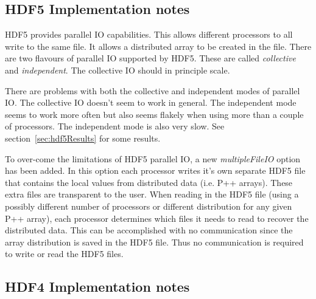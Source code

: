 \documentclass{article}
\begin{document}
\subsection{HDF5 Implementation notes}

HDF5 provides parallel IO capabilities. This allows different processors to 
all write to the same file. It allows a distributed array to be created
in the file. There are two flavours of parallel IO supported by HDF5.
These are called {\em collective} and {\em independent}. The collective IO
should in principle scale.

  There are problems with both the collective and independent modes of 
parallel IO. The collective IO doesn't seem to work in general. The independent
mode seems to work more often but also seems flakely when using more than
a couple of processors. The independent mode is also very slow. See section~\ref{sec:hdf5Results}
for some results.

To over-come the limitations of HDF5 parallel IO, a new {\em multipleFileIO}
option has been added. In this option each processor writes it's own separate
HDF5 file that contains the local values from distributed data (i.e. P++
arrays). These extra files are transparent to the user. When reading in the HDF5
file (using a possibly different number of processors or different distribution
for any given P++ array), each processor determines which files it needs to read
to recover the distributed data. This can be accomplished with no communication
since the array distribution is saved in the HDF5 file. Thus no communication is
required to write or read the HDF5 files.


\subsection{HDF4 Implementation notes}
\end{document}
